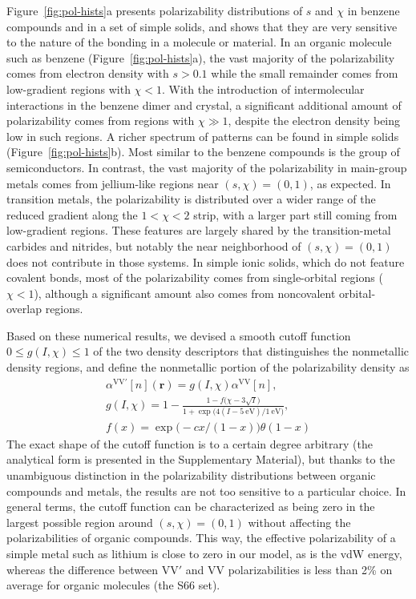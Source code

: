 Figure~\ref{fig:pol-hists}a presents polarizability distributions of $s$ and $\chi$ in benzene compounds and in a set of simple solids, and shows that they are very sensitive to the nature of the bonding in a molecule or material.
In an organic molecule such as benzene (Figure~\ref{fig:pol-hists}a), the vast majority of the polarizability
comes from electron density with $s>0.1$ while the small remainder comes
from low-gradient regions with $\chi<1$.
With the introduction of intermolecular interactions in the benzene dimer and crystal, a significant additional amount of polarizability comes from regions with $\chi\gg1$, despite the electron density being low in such regions.
A richer spectrum of patterns can be found in simple solids (Figure~\ref{fig:pol-hists}b).
Most similar to the benzene compounds is the group of semiconductors.
In contrast, the vast majority of the polarizability in main-group metals comes from jellium-like regions near $(s,\chi)=(0,1)$, as expected.
In transition metals, the polarizability is distributed over a wider range of the reduced gradient along the $1<\chi<2$ strip, with a larger part still coming from low-gradient regions.
These features are largely shared by the transition-metal carbides and nitrides, but notably the near neighborhood of $(s,\chi)=(0,1)$ does not contribute in those systems.
In simple ionic solids, which do not feature covalent bonds, most of the
polarizability comes from single-orbital regions ($\chi<1$), although a
significant amount also comes from noncovalent orbital-overlap regions.

Based on these numerical results, we devised a smooth cutoff function $0\leq g(I,\chi)\leq 1$ of the two density descriptors that distinguishes the nonmetallic density regions, and define the nonmetallic portion of the polarizability density as
\begin{gather}
  \alpha^\mathrm{VV'}[n](\mathbf r)=g(I,\chi)\alpha^\text{VV}[n], \\
  g(I,\chi)=1-\frac{1-f\bigl(\chi-3\sqrt{I}\bigr)}{1+\exp\bigl(4(I-\SI{5}{\electronvolt})/\SI{1}{\electronvolt}\bigr)}, \\
  f(x)=\exp\bigl(-cx/(1-x)\bigr)\theta(1-x)
\end{gather}
The exact shape of the cutoff function is to a certain degree arbitrary (the analytical form is presented in the Supplementary Material), but thanks to the unambiguous distinction in the polarizability distributions between organic compounds and metals, the results are not too sensitive to a particular choice.
In general terms, the cutoff function can be characterized as being zero in the largest possible region around $(s,\chi)=(0,1)$ without affecting the polarizabilities of organic compounds.
This way, the effective polarizability of a simple metal such as lithium is close to zero in our model, as is the vdW energy, whereas the difference between VV$'$ and VV polarizabilities is less than 2\% on average for organic molecules (the S66 set).

